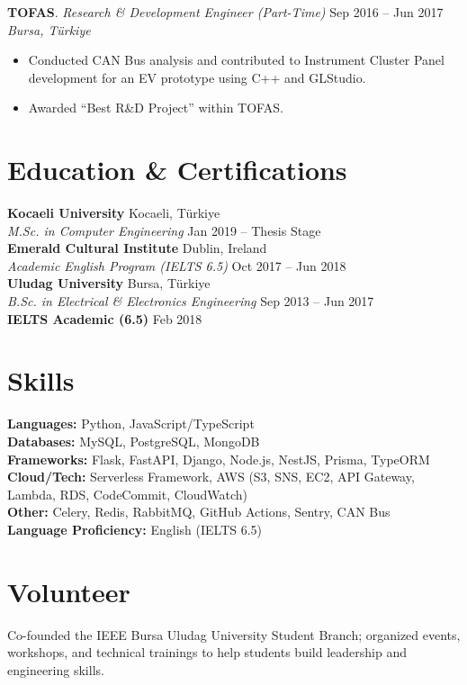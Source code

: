 \documentclass[10pt,a4paper]{extarticle}
\begin{document}
\textbf{TOFAS}. \textit{Research \& Development Engineer (Part-Time)} \hfill Sep 2016 -- Jun 2017\\
\textit{Bursa, Türkiye}
\begin{itemize}[leftmargin=*,noitemsep,topsep=0pt]
  \item Conducted CAN Bus analysis and contributed to Instrument Cluster Panel development for an EV prototype using C++ and GLStudio.
  \item Awarded ``Best R\&D Project'' within TOFAS.
\end{itemize}

\section{Education \& Certifications}
\textbf{Kocaeli University} \hfill Kocaeli, Türkiye\\
\textit{M.Sc. in Computer Engineering} \hfill Jan 2019 -- Thesis Stage\\[4pt]
\textbf{Emerald Cultural Institute} \hfill Dublin, Ireland\\
\textit{Academic English Program (IELTS 6.5)} \hfill Oct 2017 -- Jun 2018\\[4pt]
\textbf{Uludag University} \hfill Bursa, Türkiye\\
\textit{B.Sc. in Electrical \& Electronics Engineering} \hfill Sep 2013 -- Jun 2017\\[6pt]
\textbf{IELTS Academic (6.5)} \hfill Feb 2018

\section{Skills}
\textbf{Languages:} Python, JavaScript/TypeScript\\
\textbf{Databases:} MySQL, PostgreSQL, MongoDB\\
\textbf{Frameworks:} Flask, FastAPI, Django, Node.js, NestJS, Prisma, TypeORM\\
\textbf{Cloud/Tech:} Serverless Framework, AWS (S3, SNS, EC2, API Gateway, Lambda, RDS, CodeCommit, CloudWatch)\\
\textbf{Other:} Celery, Redis, RabbitMQ, GitHub Actions, Sentry, CAN Bus\\
\textbf{Language Proficiency:} English (IELTS 6.5)

\section{Volunteer}
Co-founded the IEEE Bursa Uludag University Student Branch; organized events, workshops, and technical trainings to help students build leadership and engineering skills.
\end{document}

